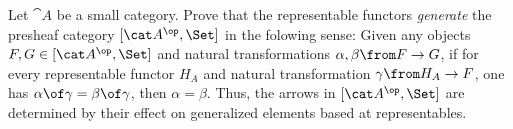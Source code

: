 \begin{answer}
\begin{enumerate}
    

  \end{enumerate}
\end{answer}

\begin{exercise}
  Let $\cat A$ be a small category. Prove that the representable functors \emph{generate} the presheaf category $[\cat A^\op,\Set]$ in the folowing sense: Given any objects $F,G\in[\cat A^\op,\Set]$ and natural transformations $\alpha,\beta\from F\to G$, if for every representable functor $H_A$ and natural transformation $\gamma\from H_A\to F$, one has $\alpha\of\gamma=\beta\of\gamma$, then $\alpha=\beta$. Thus, the arrows in $[\cat A^\op,\Set]$ are determined by their effect on generalized elements based at representables.
\end{exercise}


